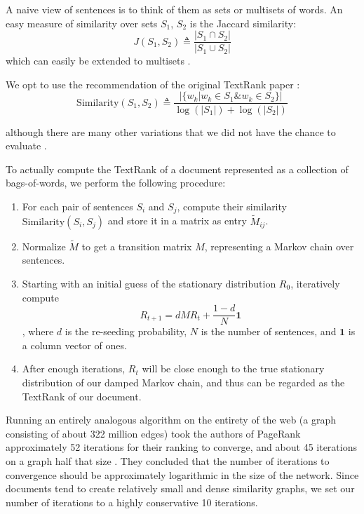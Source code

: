 A naive view of sentences is to think of them as sets or multisets of words.
An easy measure of similarity over sets $S_1$, $S_2$ is the Jaccard similarity:
\begin{equation*}
  J(S_1, S_2) \triangleq \frac{|S_1 \cap S_2|}{|S_1 \cup S_2|}
\end{equation*}
which can easily be extended to multisets \cite{wiki:Multiset}.

We opt to use the recommendation of the original TextRank paper \cite{textrank}:
\begin{equation*}
  \text{Similarity}(S_1, S_2) \triangleq \frac{ | \{ w_k | w_k \in S_1 \& w_k \in S_2 \} |}{\log(|S_1|) + \log(|S_2|)}
\end{equation*}

although there are many other variations that we did not have the chance to evaluate \cite{textrank-sim-var}.

To actually compute the TextRank of a document represented as a collection of bags-of-words, we perform the following procedure:
\begin{enumerate}
\item For each pair of sentences $S_i$ and $S_j$, compute their similarity $\text{Similarity}(S_i, S_j)$ and store it in a matrix as entry $\tilde{M}_{ij}$.
\item Normalize $\tilde{M}$ to get a transition matrix $M$, representing a Markov chain over sentences.
\item Starting with an initial guess of the stationary distribution $R_0$, iteratively compute 
  \[
    R_{t+1} = dMR_t + \frac{1-d}{N} \mathbf{1}
  \]
, where $d$ is the re-seeding probability, $N$ is the number of sentences, and $\mathbf{1}$ is a column vector of ones.
\item After enough iterations, $R_t$ will be close enough to the true stationary distribution of our damped Markov chain, and thus can be regarded as the TextRank of our document.
\end{enumerate}

Running an entirely analogous algorithm on the entirety of the web (a graph consisting of about 322 million edges) took the authors of PageRank approximately 52 iterations for their ranking to converge, and about 45 iterations on a graph half that size \cite{wiki:PageRank}. 
They concluded that the number of iterations to convergence should be approximately logarithmic in the size of the network.
Since documents tend to create relatively small and dense similarity graphs, we set our number of iterations to a highly conservative 10 iterations.
